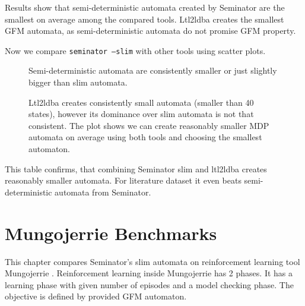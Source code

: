 \documentclass[
	digital,
nolof, nolot
]{fithesis3}
\begin{document}
		\begin{table}[ht]
			\centering
			\label{table:basic-tools}
			\caption{Results show that semi-deterministic automata created by Seminator are the smallest on average among the compared tools. Ltl2ldba creates the smallest GFM automata, as semi-deterministic automata do not promise GFM property. }
			
		\end{table}
		
		
		
		Now we compare \texttt{seminator --slim} with other tools using scatter plots.
		\begin{figure}[ht]
			\centering
			\label{scatter:seminator-slim-default}
			\caption{Semi-deterministic automata are consistently smaller or just slightly bigger than slim automata.}
			\begin{tikzpicture}
				
			\end{tikzpicture}
		\end{figure}
		
		
		\begin{figure}[ht]
			\centering
			\label{scatter:seminator-ltl2ldba}
			\caption{Ltl2ldba creates consistently small automata (smaller than 40 states), however its dominance over slim automata is not that consistent. The plot shows we can create reasonably smaller MDP automata on average using both tools and choosing the smallest automaton. }
		\begin{tikzpicture}
		
		\end{tikzpicture}
		\end{figure}
	
	\begin{table}[ht]
		\centering
		\label{table:basic-tools-mix}
		\caption{This table confirms, that combining Seminator slim and ltl2ldba creates reasonably smaller automata. For literature dataset it even beats semi-deterministic automata from Seminator.}
		
	\end{table}

	\chapter{Mungojerrie Benchmarks}
	This chapter compares Seminator's slim automata on reinforcement learning tool Mungojerrie \cite{mungojerrie}. Reinforcement learning inside Mungojerrie has 2 phases. It has a learning phase with given number of episodes and a model checking phase. The objective is defined by provided GFM automaton.\cite{mungojerrie}
	
\end{document}

